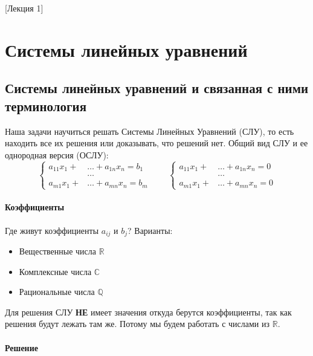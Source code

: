 [Лекция 1]

\newpage

\section{Системы линейных уравнений}


\subsection{Системы линейных уравнений и связанная с ними терминология}

Наша задачи научиться решать Системы Линейных Уравнений (СЛУ), то есть находить все их решения или доказывать, что решений нет.
Общий вид СЛУ и ее однородная версия (ОСЛУ):
\[
\left\{
\begin{aligned}
a_{11}x_1 + &\ldots + a_{1n}x_n = b_1\\
&\ldots \\
a_{m1}x_1 + &\ldots + a_{mn}x_n = b_m
\end{aligned}
\right.\quad\quad
\left\{
\begin{aligned}
a_{11}x_1 + &\ldots + a_{1n}x_n = 0\\
&\ldots \\
a_{m1}x_1 + &\ldots + a_{mn}x_n = 0
\end{aligned}
\right.
\]

\paragraph{Коэффициенты}

Где живут коэффициенты $a_{ij}$ и $b_j$?
Варианты:
\begin{itemize}
\item Вещественные числа $\mathbb R$

\item Комплексные числа $\mathbb C$

\item Рациональные числа $\mathbb Q$
\end{itemize}
Для решения СЛУ {\bf НЕ} имеет значения откуда берутся коэффициенты, так как решения будут лежать там же.
Потому мы будем работать с числами из $\mathbb R$.

\paragraph{Решение}


